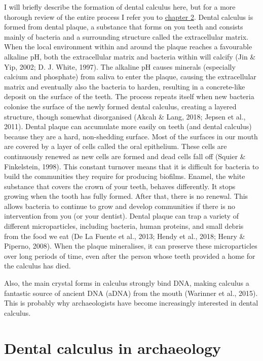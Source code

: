 \documentclass[
  letterpaper,
]{book}
\begin{document}
I will briefly describe the formation of dental calculus here, but for a
more thorough review of the entire process I refer you to
\protect\hyperlink{chap-background}{chapter 2}. Dental calculus is
formed from dental plaque, a substance that forms on you teeth and
consists mainly of bacteria and a surrounding structure called the
extracellular matrix. When the local environment within and around the
plaque reaches a favourable alkaline pH, both the extracellular matrix
and bacteria within will calcify (Jin \& Yip, 2002; D. J. White, 1997).
The alkaline pH causes minerals (especially calcium and phosphate) from
saliva to enter the plaque, causing the extracellular matrix and
eventually also the bacteria to harden, resulting in a concrete-like
deposit on the surface of the teeth. The process repeats itself when new
bacteria colonise the surface of the newly formed dental calculus,
creating a layered structure, though somewhat disorganised (Akcalı \&
Lang, 2018; Jepsen et al., 2011). Dental plaque can accumulate more
easily on teeth (and dental calculus) because they are a hard,
non-shedding surface. Most of the surfaces in our mouth are covered by a
layer of cells called the oral epithelium. These cells are continuously
renewed as new cells are formed and dead cells fall off (Squier \&
Finkelstein, 1998). This constant turnover means that it is difficult
for bacteria to build the communities they require for producing
biofilms. Enamel, the white substance that covers the crown of your
teeth, behaves differently. It stops growing when the tooth has fully
formed. After that, there is no renewal. This allows bacteria to
continue to grow and develop communities if there is no intervention
from you (or your dentist). Dental plaque can trap a variety of
different microparticles, including bacteria, human proteins, and small
debris from the food we eat (De La Fuente et al., 2013; Hendy et al.,
2018; Henry \& Piperno, 2008). When the plaque mineralises, it can
preserve these microparticles over long periods of time, even after the
person whose teeth provided a home for the calculus has died.

Also, the main crystal forms in calculus strongly bind DNA, making
calculus a fantastic source of ancient DNA (aDNA) from the mouth
(Warinner et al., 2015). This is probably why archaeologists have become
increasingly interested in dental calculus.

\hypertarget{intro-arch}{%
\section{Dental calculus in archaeology}\label{intro-arch}}
\end{document}
